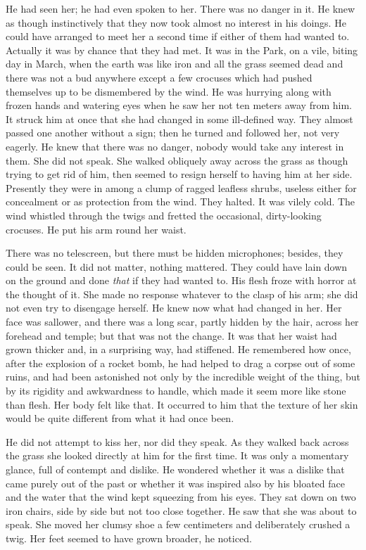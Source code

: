 He had seen her; he had even spoken to her. There was no danger in it.
He knew as though instinctively that they now took almost no interest in
his doings. He could have arranged to meet her a second time if either
of them had wanted to. Actually it was by chance that they had met. It
was in the Park, on a vile, biting day in March, when the earth was like
iron and all the grass seemed dead and there was not a bud anywhere
except a few crocuses which had pushed themselves up to be dismembered
by the wind. He was hurrying along with frozen hands and watering eyes
when he saw her not ten meters away from him. It struck him at once that
she had changed in some ill-defined way. They almost passed one another
without a sign; then he turned and followed her, not very eagerly. He
knew that there was no danger, nobody would take any interest in them.
She did not speak. She walked obliquely away across the grass as though
trying to get rid of him, then seemed to resign herself to having him at
her side. Presently they were in among a clump of ragged leafless
shrubs, useless either for concealment or as protection from the wind.
They halted. It was vilely cold. The wind whistled through the twigs and
fretted the occasional, dirty-looking crocuses. He put his arm round her
waist.

There was no telescreen, but there must be hidden microphones; besides,
they could be seen. It did not matter, nothing mattered. They could have
lain down on the ground and done \emph{that} if they had wanted to. His
flesh froze with horror at the thought of it. She made no response
whatever to the clasp of his arm; she did not even try to disengage
herself. He knew now what had changed in her. Her face was sallower, and
there was a long scar, partly hidden by the hair, across her forehead
and temple; but that was not the change. It was that her waist had grown
thicker and, in a surprising way, had stiffened. He remembered how once,
after the explosion of a rocket bomb, he had helped to drag a corpse out
of some ruins, and had been astonished not only by the incredible weight
of the thing, but by its rigidity and awkwardness to handle, which made
it seem more like stone than flesh. Her body felt like that. It occurred
to him that the texture of her skin would be quite different from what
it had once been.

He did not attempt to kiss her, nor did they speak. As they walked back
across the grass she looked directly at him for the first time. It was
only a momentary glance, full of contempt and dislike. He wondered
whether it was a dislike that came purely out of the past or whether it
was inspired also by his bloated face and the water that the wind kept
squeezing from his eyes. They sat down on two iron chairs, side by side
but not too close together. He saw that she was about to speak. She
moved her clumsy shoe a few centimeters and deliberately crushed a twig.
Her feet seemed to have grown broader, he noticed.


